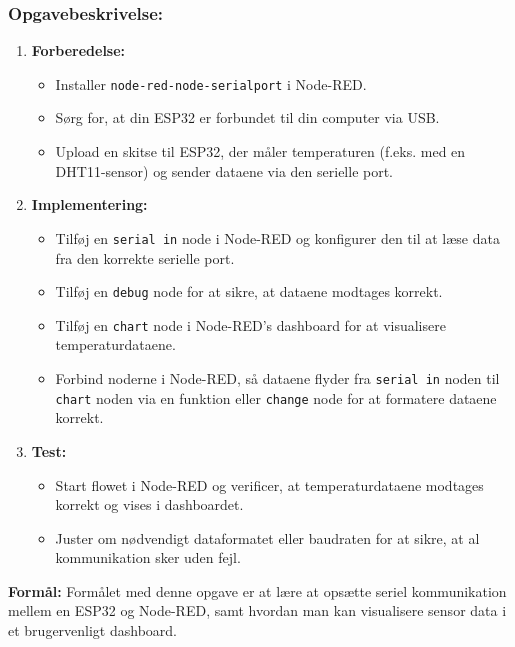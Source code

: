 \subsubsection*{Opgavebeskrivelse:}
\begin{enumerate}
	\item \textbf{Forberedelse:}
	\begin{itemize}
		\item Installer \texttt{node-red-node-serialport} i Node-RED.
		\item Sørg for, at din ESP32 er forbundet til din computer via USB.
		\item Upload en skitse til ESP32, der måler temperaturen (f.eks. med en DHT11-sensor) og sender dataene via den serielle port.
	\end{itemize}
	
	\item \textbf{Implementering:}
	\begin{itemize}
		\item Tilføj en \texttt{serial in} node i Node-RED og konfigurer den til at læse data fra den korrekte serielle port.
		\item Tilføj en \texttt{debug} node for at sikre, at dataene modtages korrekt.
		\item Tilføj en \texttt{chart} node i Node-RED's dashboard for at visualisere temperaturdataene.
		\item Forbind noderne i Node-RED, så dataene flyder fra \texttt{serial in} noden til \texttt{chart} noden via en funktion eller \texttt{change} node for at formatere dataene korrekt.
	\end{itemize}
	
	\item \textbf{Test:}
	\begin{itemize}
		\item Start flowet i Node-RED og verificer, at temperaturdataene modtages korrekt og vises i dashboardet.
		\item Juster om nødvendigt dataformatet eller baudraten for at sikre, at al kommunikation sker uden fejl.
	\end{itemize}
\end{enumerate}
\noindent \textbf{Formål:} Formålet med denne opgave er at lære at opsætte seriel kommunikation mellem en ESP32 og Node-RED, samt hvordan man kan visualisere sensor data i et brugervenligt dashboard.